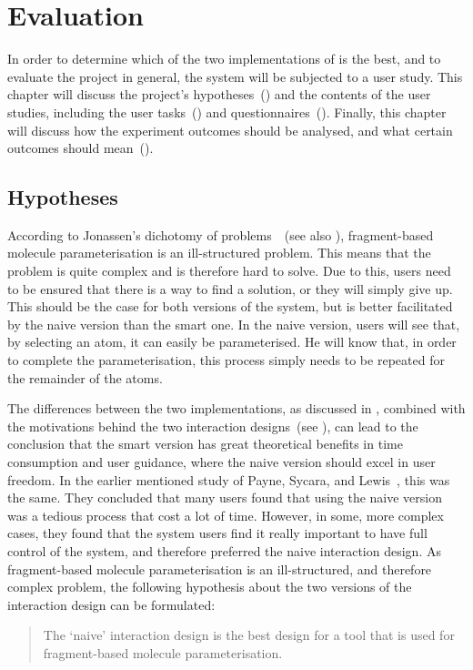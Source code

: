 \chapter{Evaluation}

In order to determine which of the two implementations of \oframp{} is the best, and to evaluate the project in general, the system will be subjected to a user study. This chapter will discuss the project's hypotheses~() and the contents of the user studies, including the user tasks~() and questionnaires~(). Finally, this chapter will discuss how the experiment outcomes should be analysed, and what certain outcomes should mean~().


\section{Hypotheses}
According to Jonassen's dichotomy of problems~\cite{jonassen2000toward}~(see also ), fragment-based molecule parameterisation is an ill-structured problem. This means that the problem is quite complex and is therefore hard to solve. Due to this, users need to be ensured that there is a way to find a solution, or they will simply give up. This should be the case for both versions of the system, but is better facilitated by the naive version than the smart one. In the naive version, users will see that, by selecting an atom, it can easily be parameterised. He will know that, in order to complete the parameterisation, this process simply needs to be repeated for the remainder of the atoms.

The differences between the two implementations, as discussed in , combined with the motivations behind the two interaction designs~(see ), can lead to the conclusion that the smart version has great theoretical benefits in time consumption and user guidance, where the naive version should excel in user freedom. In the earlier mentioned study of Payne, Sycara, and Lewis~\cite{payne2000varying}, this was the same. They concluded that many users found that using the naive version was a tedious process that cost a lot of time. However, in some, more complex cases, they found that the system users find it really important to have full control of the system, and therefore preferred the naive interaction design. As fragment-based molecule parameterisation is an ill-structured, and therefore complex problem, the following hypothesis about the two versions of the interaction design can be formulated:
\begin{quote}
The `naive' interaction design is the best design for a tool that is used for fragment-based molecule parameterisation.
\end{quote}

